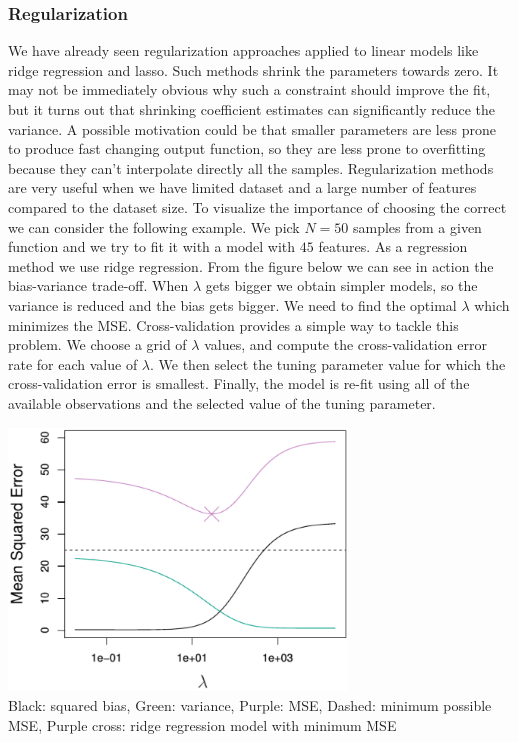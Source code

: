 \documentclass[main.tex]{subfiles}
\begin{document}
\subsubsection{Regularization}
We have already seen regularization approaches applied to linear models like ridge regression and lasso. Such methods shrink the parameters towards zero. It may not be immediately obvious why such a constraint should improve the fit, but it turns out that shrinking coefficient estimates can significantly reduce the variance. A possible motivation could be that smaller parameters are less prone to produce fast changing output function, so they are less prone to overfitting because they can't interpolate directly all the samples. Regularization methods are very useful when we have limited dataset and a large number of features compared to the dataset size. To visualize the importance of choosing the correct we can consider the following example. We pick $N = 50$ samples from a given function and we try to fit it with a model with $45$ features. As a regression method we use ridge regression.
From the figure below we can see in action the bias-variance trade-off. When $\lambda$ gets bigger we obtain simpler models, so the variance is reduced and the bias gets bigger. We need to find the optimal $\lambda$ which minimizes the MSE. Cross-validation provides a simple way to tackle this problem. We choose a grid of $\lambda$ values, and compute the cross-validation error rate for each value of $\lambda$. We then select the tuning parameter value for which the cross-validation error is smallest. Finally, the model is re-fit using all of the available observations and the selected value of the tuning parameter.

\begin{center}
   \includegraphics[width=90mm]{img/Lasso_MSE_Lambda.PNG} \\
   Black: squared bias, Green: variance, Purple: MSE, Dashed: minimum possible MSE, Purple cross: ridge regression model with minimum MSE
\end{center}
\end{document}
